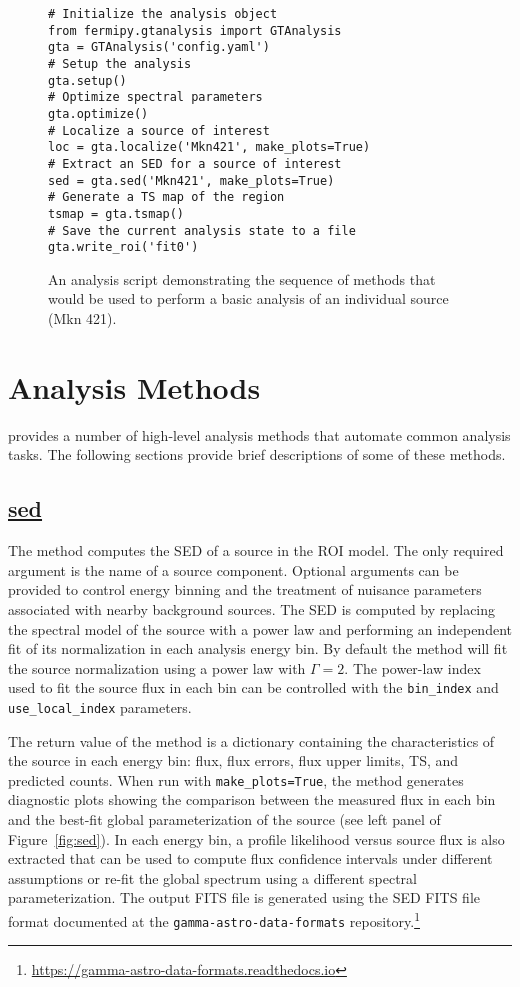 \documentclass{PoS}
\newcommand{\url}[1]{\href{#1}{#1}}
\begin{document}
\smallskip
\begin{figure}[t]
\begin{lstlisting}
# Initialize the analysis object
from fermipy.gtanalysis import GTAnalysis
gta = GTAnalysis('config.yaml')
# Setup the analysis
gta.setup()
# Optimize spectral parameters
gta.optimize()
# Localize a source of interest
loc = gta.localize('Mkn421', make_plots=True)
# Extract an SED for a source of interest
sed = gta.sed('Mkn421', make_plots=True)
# Generate a TS map of the region
tsmap = gta.tsmap()
# Save the current analysis state to a file
gta.write_roi('fit0')
\end{lstlisting}
  \caption{An analysis script demonstrating the sequence of methods
    that would be used to perform a basic analysis of an individual
    source (Mkn 421).\label{fig:fermipy_script}}
\end{figure}

\section{Analysis Methods}

{\fermipy} provides a number of high-level analysis methods that
automate common analysis tasks.  The following sections provide 
brief descriptions of some of these methods.

\subsection{\href{http://fermipy.readthedocs.org/en/\version/advanced/sed.html}{sed}}

The {\sed} method computes the SED of a source in the ROI model.  The
only required argument is the name of a source component.  Optional
arguments can be provided to control energy binning and the treatment
of nuisance parameters associated with nearby background sources.  The
SED is computed by replacing the spectral model of the source with a
power law and performing an independent fit of its normalization in
each analysis energy bin.  By default the method will fit the source
normalization using a power law with $\Gamma=2$.  The power-law index
used to fit the source flux in each bin can be controlled with the
\lstinline$bin_index$ and \lstinline$use_local_index$ parameters.

The return value of the method is a dictionary containing the
characteristics of the source in each energy bin: flux, flux errors,
flux upper limits, TS, and predicted counts.  When run with
\lstinline$make_plots=True$, the method generates diagnostic plots
showing the comparison between the measured flux in each bin and the
best-fit global parameterization of the source (see left panel of
Figure~\ref{fig:sed}).  In each energy bin, a profile likelihood
versus source flux is also extracted that can be used to compute flux
confidence intervals under different assumptions or re-fit the global
spectrum using a different spectral parameterization.  The output FITS
file is generated using the SED FITS file format documented at the
\texttt{gamma-astro-data-formats}
repository.\footnote{\url{https://gamma-astro-data-formats.readthedocs.io}}
\end{document}
